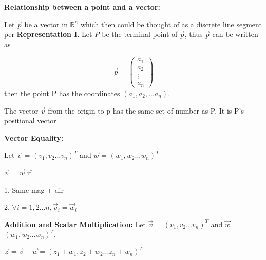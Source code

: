 \documentclass{article}
\begin{document}
\medskip

\textbf{Relationship between a point and a vector:}

Let $\vec{p}$ be a vector in $\mathbb{R} ^ n$ which then could be thought of as 
a discrete line segment per \textbf{Representation I}. Let \emph{P} be the terminal point of
$\vec{p}$, thus $\vec{p}$ can be written as 

\[
  \vec{p} = \begin{pmatrix}
      a_1 \\
      a_2 \\
      \vdots \\
      a_n
  \end{pmatrix}  
\]
then the point P has the coordinates $(a_1, a_2, ... a_n)$.

The vector $\vec{v}$ from the origin to p has the same set of number as P. 
It is P's positional vector

\medskip

\textbf{Vector Equality: }

Let $\vec{v}$ = $(v_1, v_2...v_n)^T$ and $\vec{w}$ = $(w_1, w_2...w_n)^T$

$\vec{v}$ = $\vec{w}$ if

1. Same mag + dir

2. $\forall i = 1, 2 ... n, \vec{v}_i = \vec{w}_i$

\medskip

\textbf{Addition and Scalar Multiplication:}
Let $\vec{v}$ = $(v_1, v_2...v_n)^T$ and $\vec{w}$ = $(w_1, w_2...w_n)^T$, 

$\vec{z} = \vec{v} + \vec{w} = (z_1+w_1, z_2+w_2...z_n+w_n)^T$
\end{document}
